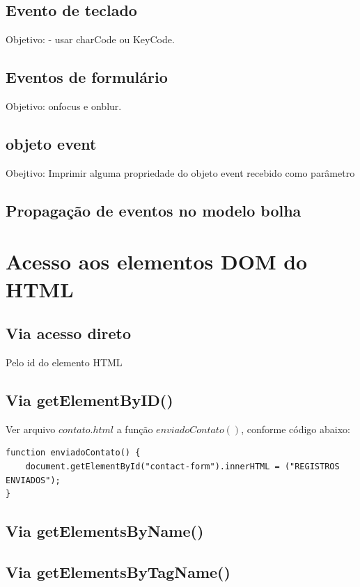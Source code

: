 \subsection{Evento de teclado}
 Objetivo:  - usar charCode ou KeyCode.
 
 
\subsection{Eventos de formulário}
Objetivo: onfocus e onblur.


\subsection{objeto event}
Obejtivo: Imprimir alguma propriedade do objeto event recebido como parâmetro

\subsection{Propagação de eventos no modelo bolha}

\section{Acesso aos elementos DOM do HTML }

\subsection{Via acesso direto}

 Pelo id do elemento HTML
 
\subsection{Via getElementByID()}
	Ver arquivo $contato.html$ a função $enviadoContato()$, conforme código abaixo:
	
\begin{lstlisting}
function enviadoContato() {
    document.getElementById("contact-form").innerHTML = ("REGISTROS ENVIADOS");
}
\end{lstlisting}

\subsection{Via getElementsByName()}



\subsection{Via getElementsByTagName()}



